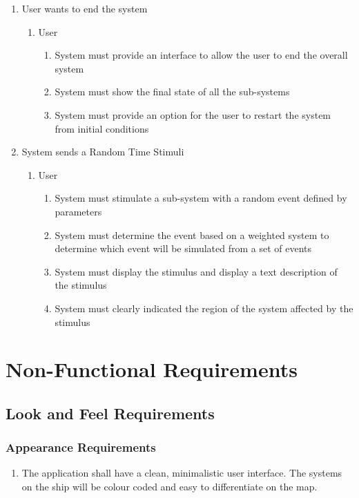 \documentclass[12pt, titlepage]{article}
\begin{document}
\begin{enumerate}[{BE}1.]
	\item User wants to end the system
	\begin{enumerate}[{VP8}.1]
		\item User
			\begin{enumerate}
				\item System must provide an interface to allow the user to end the overall system
				\item System must show the final state of all the sub-systems
				\item System must provide an option for the user to restart the system from initial conditions
			\end{enumerate}
	\end{enumerate}
	
	\item System sends a Random Time Stimuli
	\begin{enumerate}[{VP9}.1]
		\item User
			\begin{enumerate}
				\item System must stimulate a sub-system with a random event defined by parameters
				\item System must determine the event based on a weighted system to determine which event will be simulated from a set of events
				\item System must display the stimulus and display a text description of the stimulus
				\item System must clearly indicated the region of the system affected by the stimulus
			\end{enumerate}
	\end{enumerate}
	
	
\end{enumerate}



\section{Non-Functional Requirements}
\label{sec:non-functional_requirements}
\subsection{Look and Feel Requirements}
\label{sub:look_and_feel_requirements}

\subsubsection{Appearance Requirements}
\label{ssub:appearance_requirements}
\begin{enumerate}[{LF}1. ]
	\item The application shall have a clean, minimalistic user interface. The systems on the ship will be colour coded and easy to differentiate on the map.
\end{enumerate}
\end{document}

